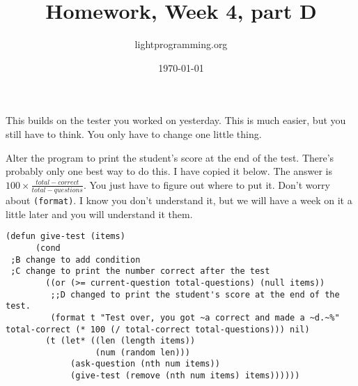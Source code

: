 \documentclass{article}
\title{Homework, Week 4, part D}
\author{lightprogramming.org}
\date{\today}
\begin{document}
\maketitle{}

This builds on the tester you worked on yesterday. This is much easier, but you still have to think. You only have to change one little thing.

Alter the program to print the student's score at the end of the test. There's probably only one best way to do this. I have copied it below. The answer is $100 \times \frac{total-correct}{total-questions}$. You just have to figure out where to put it. Don't worry about \texttt{(format)}. I know you don't understand it, but we will have a week on it a little later and you will understand it them.

\lstset{language=Lisp,numbers=left,keepspaces=false,basicstyle=\small,numberstyle=\tiny,breaklines=true,showstringspaces=false}
\begin{lstlisting}
(defun give-test (items)
      (cond
 ;B change to add condition
 ;C change to print the number correct after the test
        ((or (>= current-question total-questions) (null items)) 
         ;;D changed to print the student's score at the end of the test.
         (format t "Test over, you got ~a correct and made a ~d.~%" total-correct (* 100 (/ total-correct total-questions))) nil)
        (t (let* ((len (length items))
                  (num (random len)))
             (ask-question (nth num items))
             (give-test (remove (nth num items) items))))))
\end{lstlisting}
\end{document}
